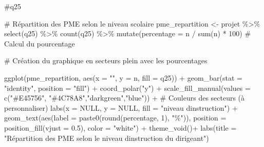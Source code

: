 \documentclass[
  letterpaper,
  DIV=11,
  numbers=noendperiod]{scrartcl}
\newenvironment{Shaded}{\begin{snugshade}}{\end{snugshade}}
\newcommand{\AttributeTok}[1]{\textcolor[rgb]{0.40,0.45,0.13}{#1}}
\newcommand{\CommentTok}[1]{\textcolor[rgb]{0.37,0.37,0.37}{#1}}
\newcommand{\ConstantTok}[1]{\textcolor[rgb]{0.56,0.35,0.01}{#1}}
\newcommand{\DecValTok}[1]{\textcolor[rgb]{0.68,0.00,0.00}{#1}}
\newcommand{\FloatTok}[1]{\textcolor[rgb]{0.68,0.00,0.00}{#1}}
\newcommand{\FunctionTok}[1]{\textcolor[rgb]{0.28,0.35,0.67}{#1}}
\newcommand{\NormalTok}[1]{\textcolor[rgb]{0.00,0.23,0.31}{#1}}
\newcommand{\OtherTok}[1]{\textcolor[rgb]{0.00,0.23,0.31}{#1}}
\newcommand{\SpecialCharTok}[1]{\textcolor[rgb]{0.37,0.37,0.37}{#1}}
\newcommand{\StringTok}[1]{\textcolor[rgb]{0.13,0.47,0.30}{#1}}
\begin{document}
\begin{Shaded}
\begin{Highlighting}[]
\CommentTok{\#q25}


\CommentTok{\# Répartition des PME selon le niveau scolaire}
\NormalTok{pme\_repartition }\OtherTok{\textless{}{-}}\NormalTok{ projet }\SpecialCharTok{\%\textgreater{}\%}
  \FunctionTok{select}\NormalTok{(q25) }\SpecialCharTok{\%\textgreater{}\%}
  \FunctionTok{count}\NormalTok{(q25) }\SpecialCharTok{\%\textgreater{}\%}
  \FunctionTok{mutate}\NormalTok{(}\AttributeTok{percentage =}\NormalTok{ n }\SpecialCharTok{/} \FunctionTok{sum}\NormalTok{(n) }\SpecialCharTok{*} \DecValTok{100}\NormalTok{)  }\CommentTok{\# Calcul du pourcentage}

\CommentTok{\# Création du graphique en secteurs plein avec les pourcentages}

\FunctionTok{ggplot}\NormalTok{(pme\_repartition, }\FunctionTok{aes}\NormalTok{(}\AttributeTok{x =} \StringTok{""}\NormalTok{, }\AttributeTok{y =}\NormalTok{ n, }\AttributeTok{fill =}\NormalTok{ q25)) }\SpecialCharTok{+}
  \FunctionTok{geom\_bar}\NormalTok{(}\AttributeTok{stat =} \StringTok{"identity"}\NormalTok{, }\AttributeTok{position =} \StringTok{"fill"}\NormalTok{) }\SpecialCharTok{+}
  \FunctionTok{coord\_polar}\NormalTok{(}\StringTok{"y"}\NormalTok{) }\SpecialCharTok{+}
  \FunctionTok{scale\_fill\_manual}\NormalTok{(}\AttributeTok{values =} \FunctionTok{c}\NormalTok{(}\StringTok{"\#E45756"}\NormalTok{, }\StringTok{"\#4C78A8"}\NormalTok{,}\StringTok{"darkgreen"}\NormalTok{,}\StringTok{"blue"}\NormalTok{)) }\SpecialCharTok{+}  \CommentTok{\# Couleurs des secteurs (à personnaliser)}
  \FunctionTok{labs}\NormalTok{(}\AttributeTok{x =} \ConstantTok{NULL}\NormalTok{, }\AttributeTok{y =} \ConstantTok{NULL}\NormalTok{, }\AttributeTok{fill =} \StringTok{"niveau d\textquotesingle{}instruction"}\NormalTok{) }\SpecialCharTok{+}
  \FunctionTok{geom\_text}\NormalTok{(}\FunctionTok{aes}\NormalTok{(}\AttributeTok{label =} \FunctionTok{paste0}\NormalTok{(}\FunctionTok{round}\NormalTok{(percentage, }\DecValTok{1}\NormalTok{), }\StringTok{"\%"}\NormalTok{)), }\AttributeTok{position =} \FunctionTok{position\_fill}\NormalTok{(}\AttributeTok{vjust =} \FloatTok{0.5}\NormalTok{), }\AttributeTok{color =} \StringTok{"white"}\NormalTok{) }\SpecialCharTok{+}
  \FunctionTok{theme\_void}\NormalTok{()}\SpecialCharTok{+}
  \FunctionTok{labs}\NormalTok{(}\AttributeTok{title =} \StringTok{"Répartition des PME selon le niveau d\textquotesingle{}instruction du dirigeant"}\NormalTok{)}
\end{Highlighting}
\end{Shaded}
\end{document}
